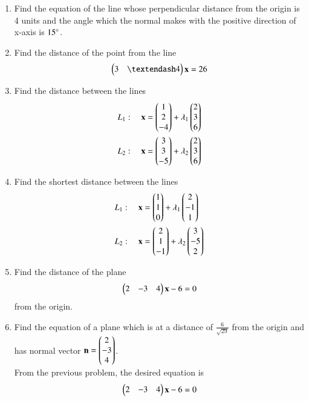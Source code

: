 \renewcommand{\theequation}{\theenumi}
\begin{enumerate}[label=\arabic*.,ref=\thesubsection.\theenumi]
%


\item Find the equation of the line whose perpendicular distance from the origin is 4 units and the angle which the normal makes with the positive direction of x-axis is $15\degree$.
%

\item Find the distance of the point  from the line 
\begin{align}
\myvec{3 & – 4}\vec{x}  = 26
\end{align}
%
\item Find the 
distance between the lines 
\begin{align}
L_1: \quad \mathbf{x} &= \begin{pmatrix}1\\2\\-4\end{pmatrix} + \lambda_1\begin{pmatrix}2 \\ 3 \\6\end{pmatrix}
\\
L_2: \quad \mathbf{x} &= \begin{pmatrix}3\\3\\-5\end{pmatrix} + \lambda_2\begin{pmatrix}2 \\ 3 \\6\end{pmatrix}
\end{align}
\label{prob:line_dist_parallel}
%


\item Find the shortest distance between the lines 
\begin{align}
L_1: \quad \mathbf{x} &= \begin{pmatrix}1\\1\\0\end{pmatrix} + \lambda_1\begin{pmatrix}2 \\ -1 \\1\end{pmatrix}
\\
L_2: \quad \mathbf{x} &= \begin{pmatrix}2\\1\\-1\end{pmatrix} + \lambda_2\begin{pmatrix}3 \\ -5 \\2\end{pmatrix}
\end{align}
\label{prob:line_dist_skew}
%


\item Find the distance of the plane 
\begin{align}
\begin{pmatrix}2 & -3 & 4\end{pmatrix}\mathbf{x}-6  = 0
\end{align}
%
from the origin.


\item Find the equation of a plane which is at a distance of $\frac{6}{\sqrt{29}}$ from the origin and has  normal vector $\mathbf{n}=\begin{pmatrix}2\\-3\\4\end{pmatrix}$.
%
\\
\solution From the previous problem, the desired equation is
%
\begin{align}
\begin{pmatrix}2 & -3 & 4\end{pmatrix}\mathbf{x}-6  = 0
\end{align}
%


\end{enumerate}
